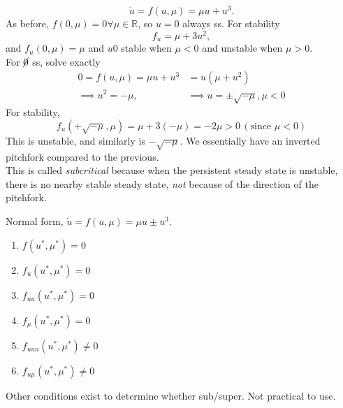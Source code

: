\documentclass[12pt, oneside]{article}
\begin{document}
$$\dot{u} = f(u,\mu) = \mu u + u^3.$$ As before, $f(0, \mu) = 0 \forall \mu \in \mathbb{R}$, so $u = 0$ always ss. For stability \[f_u = \mu + 3u^2,\] and $f_u(0, \mu) = \mu$ and $u  0$ stable when $\mu <0$ and unstable when $\mu > 0$.\\
For $\cancel{0}$ ss, solve exactly
\begin{align*}
  0 = f(u, \mu) = \mu u + u^3 &= u(\mu + u^2)\\
  \implies u^2 = -\mu, &\implies u = \pm \sqrt{- \mu}, \mu < 0
\end{align*}
For stability,
$$f_u(+\sqrt{-\mu}, \mu) = \mu + 3(-\mu) =-2\mu > 0\, (\text{since } \mu <0)$$
This is unstable, and similarly is $- \sqrt{-\mu}$. We essentially have an inverted pitchfork compared to the previous.\\ 
This is called \textit{subcritical} because when the persistent steady state is unstable, there is no nearby stable steady state, \textit{not} because of the direction of the pitchfork.

\begin{definition}
  Normal form, $\dot{u} = f(u, \mu) = \mu u \pm u^3$.
  \begin{enumerate}[label=\roman*)]
    \item $f(u^*, \mu^*) = 0$
    \item $f_u(u^*, \mu^*) = 0$
    \item $f_{uu}(u^*, \mu^*) = 0$
    \item $f_\mu(u^*, \mu^*) = 0$
    \item $f_{uuu}(u^*, \mu^*) \neq 0$
    \item $f_{u\mu}(u^*, \mu^*) \neq 0$
  \end{enumerate}
  Other conditions exist to determine whether sub/super. Not practical to use.
\end{definition}
\end{document}
